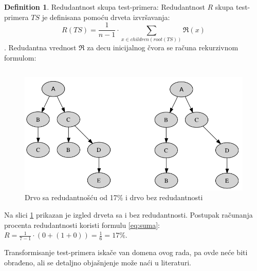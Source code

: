\documentclass[a4paper]{article}
\theoremstyle{definition}
\newtheorem{definition}{Definition}[section]
\begin{document}
\begin{definition}{Redudantnost skupa test-primera:}
Redudantnost $R$ skupa test-primera $TS$ je definisana pomoću drveta izvršavanja:
\begin{equation}
\label{eq:suma}
    R(TS) = \frac{1}{n-1} \cdot \sum_{x \in children(root(TS))} \Re(x)
\end{equation}.
Redudantna vrednost $\Re$ za decu inicijalnog čvora se računa rekurzivnom formulom:
\end{definition}

\begin{verbatim}
\end{verbatim}

\begin{figure}[h!]
\begin{center}
\includegraphics[scale=0.25]{redudancy.png}
\end{center}
\caption{Drvo sa redudantnošću od 17\% i drvo bez redudantnosti}
\label{fig:redudancy}
\end{figure}

Na slici \ref{fig:redudancy} prikazan je izgled drveta sa i bez redudantnosti. Postupak računanja procenta redudantnosti koristi formulu \ref{eq:suma}:
$ R = \frac{1}{7-1} \cdot (0 + (1+0)) = \frac{1}{6} = 17\% $.

Transformisanje test-primera iskače van domena ovog rada, pa ovde neće biti obrađeno, ali se detaljno objašnjenje može naći u literaturi\cite{prvinacin}.
\end{document}
